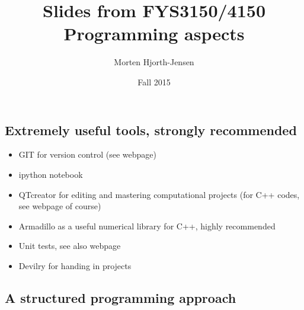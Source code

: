 \documentclass[%
twoside,                 %
final,                   %
10pt]{article}
\newenvironment{block_mdfboxadmon}[1][]{
\begin{block_mdfboxmdframed}[frametitle=#1]
}
{
\end{block_mdfboxmdframed}
}
\begin{document}






\title{Slides from FYS3150/4150 Programming aspects}


\author{Morten Hjorth-Jensen}

\date{Fall 2015
}

\subsection{Extremely useful tools, strongly recommended}


\begin{block_mdfboxadmon}
\begin{itemize}
  \item GIT for version control (see webpage)

  \item ipython notebook

  \item QTcreator for editing and mastering computational projects (for C++ codes, see webpage of course)

  \item Armadillo as a useful numerical library for C++, highly recommended

  \item Unit tests, see also webpage

  \item Devilry for handing in projects
\end{itemize}

\noindent
\end{block_mdfboxadmon}



\subsection{A structured programming approach}
\end{document}
